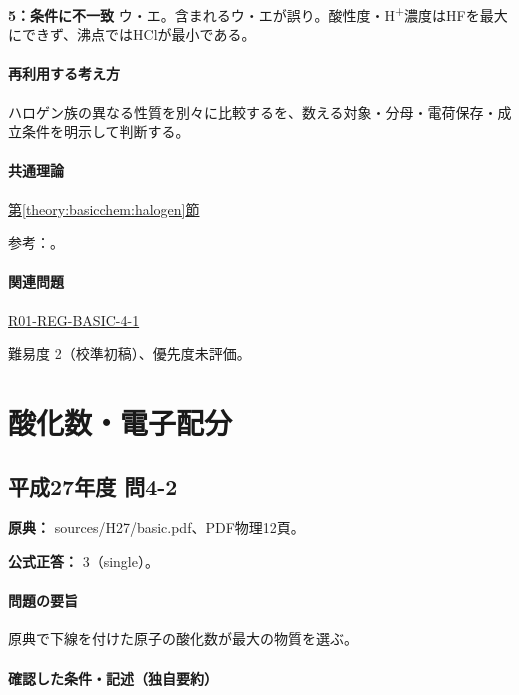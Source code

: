 \noindent\textbf{5：条件に不一致} ウ・エ。含まれるウ・エが誤り。酸性度・H\textsuperscript{+}濃度はHFを最大にできず、沸点ではHClが最小である。\par

\paragraph{再利用する考え方} ハロゲン族の異なる性質を別々に比較するを、数える対象・分母・電荷保存・成立条件を明示して判断する。

\paragraph{共通理論} \hyperref[theory:basicchem:halogen]{第\ref*{theory:basicchem:halogen}節}

\par 参考：\cite{purdue_halogens,rsc_halogen,nist_halogen_properties,msu_hydrogen_bonding,purdue_acid_strength,yale_hydrohalic}。

\paragraph{関連問題} \hyperref[q:r01-reg-basic-4-1]{R01-REG-BASIC-4-1}

\par 難易度 2（校準初稿）、優先度未評価。

\section{酸化数・電子配分}

\subsection{平成27年度 問4-2}
\label{q:h27-reg-basic-4-2}

\noindent\textbf{原典：} sources/H27/basic.pdf、PDF物理12頁。

\textbf{公式正答：} 3（single）。

\paragraph{問題の要旨} 原典で下線を付けた原子の酸化数が最大の物質を選ぶ。

\paragraph{確認した条件・記述（独自要約）}\mbox{}\par


